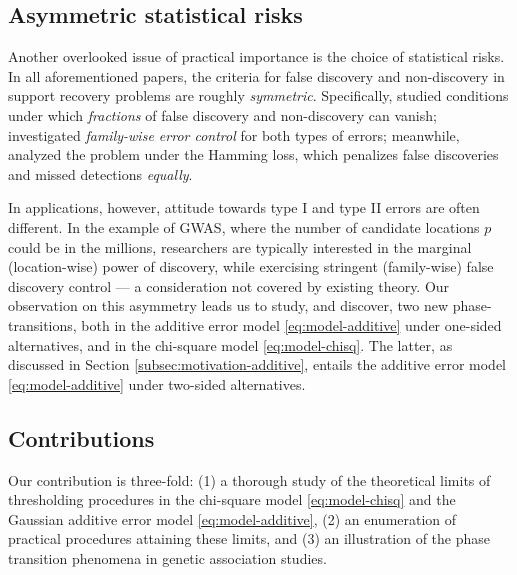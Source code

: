 \subsection{Asymmetric statistical risks}
\label{subsec:asymmetric-risk}

Another overlooked issue of practical importance is the choice of statistical risks.
In all aforementioned papers, the criteria for false discovery and non-discovery in support recovery problems are roughly \emph{symmetric}.
Specifically, \citet{arias2017distribution} studied conditions under which \emph{fractions} of false discovery and non-discovery can vanish; \citet{gao2018fundamental} investigated \emph{family-wise error control} for both types of errors; meanwhile, \citet{butucea2018variable} analyzed the problem under the Hamming loss, which penalizes false discoveries and missed detections \emph{equally}.

In applications, however, attitude towards type I and type II errors are often different.
In the example of GWAS, where the number of candidate locations $p$ could be in the millions, researchers are typically interested in the marginal (location-wise) power of discovery, while exercising stringent (family-wise) false discovery control --- a consideration not covered by existing theory.
Our observation on this asymmetry leads us to study, and discover, two new phase-transitions, both in the additive error model \eqref{eq:model-additive} under one-sided alternatives, and in the chi-square model \eqref{eq:model-chisq}.
The latter, as discussed in Section \ref{subsec:motivation-additive}, entails the additive error model \eqref{eq:model-additive} under two-sided alternatives.

\subsection{Contributions}

Our contribution is three-fold: (1) a thorough study of the theoretical limits of thresholding procedures in the chi-square model \eqref{eq:model-chisq} and the Gaussian additive error model \eqref{eq:model-additive}, (2) an enumeration of practical procedures attaining these limits, and (3) an illustration of the phase transition phenomena in genetic association studies.

